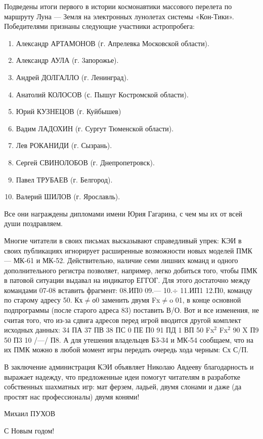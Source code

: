 \documentclass[11pt,a4paper,oneside]{article}
\begin{document}
Подведены итоги первого в истории космонавтики массового перелета по маршруту Луна — Земля на электронных лунолетах системы «Кон-Тики». Победителями признаны следующие участники астропробега:
\begin{enumerate}
\item Александр АРТАМОНОВ (г. Апрелевка Московской области).
\item Александр АУЛА (г. 3апорожье).
\item Андрей ДОЛГАЛЛО (г. Ленинград).
\item Анатолий КОЛОСОВ (с. Пышуг Костромской области).
\item Юрий КУЗНЕЦОВ (г. Куйбышев)
\item Вадим ЛАДОХИН (г. Сургут Тюменской области).
\item Лев РОКАНИДИ (г. Сызрань).
\item Сергей СВИНОЛОБОВ (г. Днепропетровск).
\item Павел ТРУБАЕВ (г. Белгород).
\item Валерий ШИЛОВ (г. Ярославль).
\end{enumerate}

Все они награждены дипломами имени Юрия Гагарина, с чем мы их от всей души поздравляем.

Многие читатели в своих письмах высказывают справедливый упрек: КЭИ в своих публикациях игнорирует расширенные возможности новых моделей ПМК — МК-61 и МК-52. Действительно, наличие семи лишних команд и одного дополнительного регистра позволяет, например, легко добиться того, чтобы ПМК в патовой ситуации выдавал на индикатор ЕГГОГ. Для этого достаточно между командами 07-08 вставить фрагмент: 08.ИП0 09.— 10.$\div$ 11.ИП1 12.П0, команду по старому адресу 50. Кх$\neq$о0 заменить двумя Fx$\neq$o 01, в конце основной подпрограммы (после старого адреса 83) поставить В/О. Вот и все изменения, не считая того, что из-за сдвига адресов перед игрой вводится другой комплект исходных данных: 34 ПА 37 ПВ 38 ПС 0 ПЕ П0 91 ПД 1 ВП 50 Fx$^{2}$ Fx$^{2}$ 90 X П9 50 П3 10 /—/ П8. А для утешения владельцев Б3-34 и МК-54 сообщаем, что на их ПМК можно в любой момент игры передать очередь хода черным: Сх С/П.

В заключение администрация КЭИ объявляет Николаю Авдееву благодарность и выражает надежду, что предложенные идеи помогут читателям в разработке собственных шахматных игр: мат ферзем, ладьей, двумя слонами и даже (да простят нас профессионалы) двумя конями!

Михаил ПУХОВ

С Новым годом!
\end{document}
